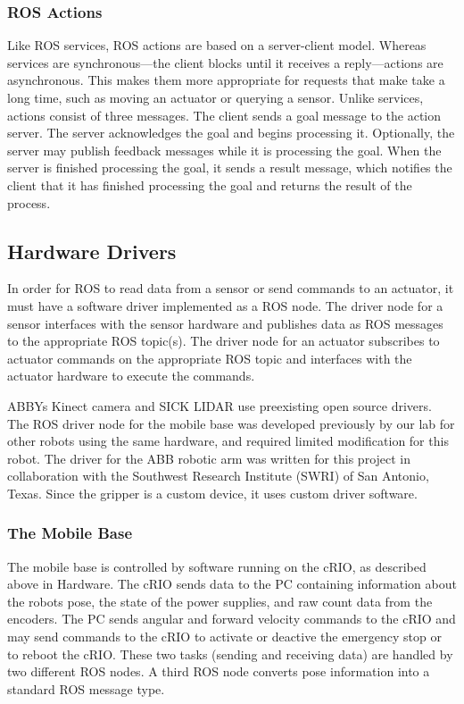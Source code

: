 \documentclass{cwru}
\begin{document}
\subsubsection{ROS Actions}
Like ROS services, ROS actions are based on a server-client model. Whereas services are synchronous---the client blocks until it receives a reply---actions are asynchronous. This makes them more appropriate for requests that make take a long time, such as moving an actuator or querying a sensor. Unlike services, actions consist of three messages. The client sends a goal message to the action server. The server acknowledges the goal and begins processing it. Optionally, the server may publish feedback messages while it is processing the goal. When the server is finished processing the goal, it sends a result message, which notifies the client that it has finished processing the goal and returns the result of the process. \cite{ros-actionlib}

\subsection{Hardware Drivers}
In order for ROS to read data from a sensor or send commands to an actuator, it must have a software driver implemented as a ROS node. The driver node for a sensor interfaces with the sensor hardware and publishes data as ROS messages to the appropriate ROS topic(s). The driver node for an actuator subscribes to actuator commands on the appropriate ROS topic and interfaces with the actuator hardware to execute the commands.

ABBY{\textquotesingle}s Kinect camera and SICK LIDAR use preexisting open source drivers. The ROS driver node for the mobile base was developed previously by our lab for other robots using the same hardware, and required limited modification for this robot.\cite{igvc-2010-harlie} The driver for the ABB robotic arm was written for this project in collaboration with the Southwest Research Institute (SWRI) of San Antonio, Texas. Since the gripper is a custom device, it uses custom driver software.

\subsubsection{The Mobile Base}
The mobile base is controlled by software running on the cRIO, as described above in Hardware. The cRIO sends data to the PC containing information about the robot{\textquotesingle}s pose, the state of the power supplies, and raw count data from the encoders. The PC sends angular and forward velocity commands to the cRIO and may send commands to the cRIO to activate or deactive the emergency stop or to reboot the cRIO. These two tasks (sending and receiving data) are handled by two different ROS nodes. A third ROS node converts pose information into a standard ROS message type.
\end{document}
